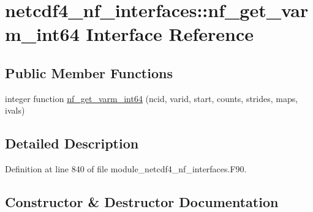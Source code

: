 \hypertarget{interfacenetcdf4__nf__interfaces_1_1nf__get__varm__int64}{}\section{netcdf4\+\_\+nf\+\_\+interfaces\+:\+:nf\+\_\+get\+\_\+varm\+\_\+int64 Interface Reference}
\label{interfacenetcdf4__nf__interfaces_1_1nf__get__varm__int64}
\subsection*{Public Member Functions}
\begin{DoxyCompactItemize}
\item 
integer function \hyperlink{interfacenetcdf4__nf__interfaces_1_1nf__get__varm__int64_a76a8fa24108bdc8e9f4597dc89e1ba89}{nf\+\_\+get\+\_\+varm\+\_\+int64} (ncid, varid, start, counts, strides, maps, ivals)
\end{DoxyCompactItemize}


\subsection{Detailed Description}


Definition at line 840 of file module\+\_\+netcdf4\+\_\+nf\+\_\+interfaces.\+F90.



\subsection{Constructor \& Destructor Documentation}
\mbox{\label{interfacenetcdf4__nf__interfaces_1_1nf__get__varm__int64_a76a8fa24108bdc8e9f4597dc89e1ba89}} 
